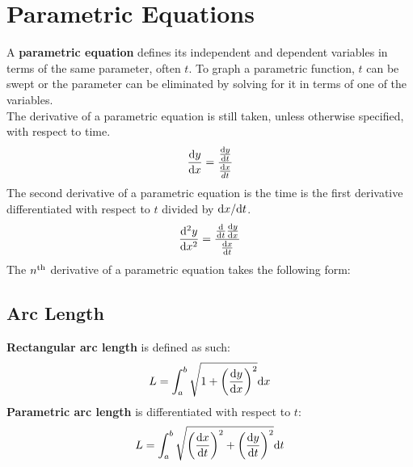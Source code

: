 \documentclass[../AP_Calculus]{subfiles}
\begin{document}
	\section{Parametric Equations}
		A \textbf{parametric equation} defines its independent and dependent variables in terms of the same parameter, often $t$.
		To graph a parametric function, $t$ can be swept or the parameter can be eliminated by solving for it in terms of one of the variables. \\
		The derivative of a parametric equation is still taken, unless otherwise specified, with respect to time.
		\[\frac{\mathrm{d} y}{\mathrm{d} x} = \frac{\frac{\mathrm{d} y}{\mathrm{d} t}}{\frac{\mathrm{d} x}{d t}}\]
		The second derivative of a parametric equation is the time is the first derivative differentiated with respect to $t$ divided by $\mathrm{d} x/\mathrm{d} t$.
		\[\frac{\mathrm{d}^2y}{\mathrm{d} x^2} = \frac{\frac{\mathrm{d}}{\mathrm{d} t}\frac{\mathrm{d} y}{\mathrm{d} x}}{\frac{\mathrm{d} x}{\mathrm{d} t}}\]
		The $n^{\mathrm{th}}$ derivative of a parametric equation takes the following form: \\
		\subsection*{Arc Length}
			\textbf{Rectangular arc length} is defined as such:
			\[L = \int_a^b\sqrt{1 + \left(\frac{\mathrm{d} y}{\mathrm{d} x}\right)^2}\mathrm{d} x\]
		\textbf{Parametric arc length} is differentiated with respect to $t$:
		\[L = \int_a^b\sqrt{\left(\frac{\mathrm{d} x}{\mathrm{d} t}\right)^2 + \left(\frac{\mathrm{d} y}{\mathrm{d} t}\right)^2}\mathrm{d} t\]
\end{document}
